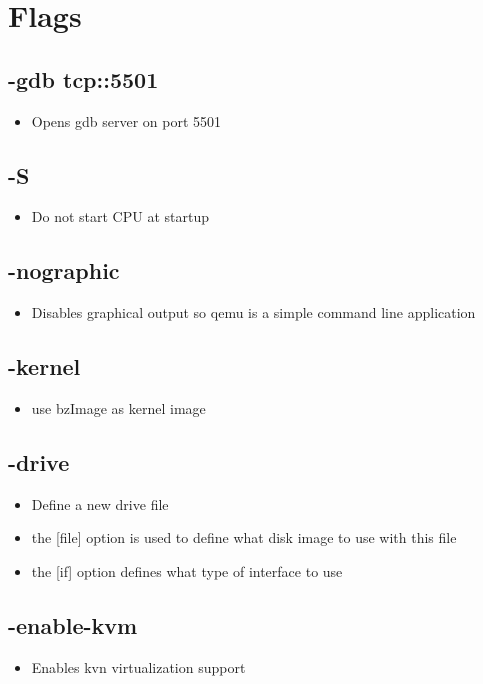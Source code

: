 \documentclass[a4paper, 10pt, draftclsnofoot, onecolumn]{article}
\begin{document}
\section{Flags}
\subsection{-gdb tcp::5501}
\begin{itemize}
\item Opens gdb server on port 5501
\end{itemize}

\subsection{-S}
\begin{itemize}
\item Do not start CPU at startup
\end{itemize}

\subsection{-nographic}
\begin{itemize}
\item Disables graphical output so qemu is a simple command line application
\end{itemize}

\subsection{-kernel}
\begin{itemize}
\item use bzImage as kernel image
\end{itemize}

\subsection{-drive}
\begin{itemize}
\item Define a new drive file
\item the [file] option is used to define what disk image to use with this file
\item the [if] option defines what type of interface to use
\end{itemize}

\subsection{-enable-kvm}
\begin{itemize}
\item Enables kvn virtualization support
\end{itemize}
\end{document}
